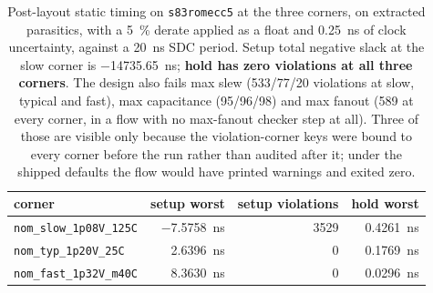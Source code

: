 \documentclass[11pt,a4paper]{article}
\newcommand{\file}[1]{\texttt{\small #1}}
\begin{document}
\begin{table}[t]
\centering
\small
\begin{tabular}{lrrr}
\toprule
corner & setup worst & setup violations & hold worst \\
\midrule
\texttt{nom\_slow\_1p08V\_125C} & \SI{-7.5758}{\nano\second} &
  \num{3529} & \SI{+0.4261}{\nano\second} \\
\texttt{nom\_typ\_1p20V\_25C} & \SI{+2.6396}{\nano\second} &
  \num{0} & \SI{+0.1769}{\nano\second} \\
\texttt{nom\_fast\_1p32V\_m40C} & \SI{+8.3630}{\nano\second} &
  \num{0} & \SI{+0.0296}{\nano\second} \\
\bottomrule
\end{tabular}
\caption{Post-layout static timing on \file{s83romecc5} at the three
corners, on extracted parasitics, with a \SI{5}{\percent} derate
applied as a float and \SI{0.25}{\nano\second} of clock uncertainty,
against a \SI{20}{\nano\second} SDC period. Setup total negative slack
at the slow corner is \SI{-14735.65}{\nano\second}; \textbf{hold has
zero violations at all three corners}. The design also fails max slew
(\num{533}/\num{77}/\num{20} violations at slow, typical and fast), max
capacitance (\num{95}/\num{96}/\num{98}) and max fanout (\num{589} at
every corner, in a flow with no max-fanout checker step at all). Three
of those are visible only because the violation-corner keys were bound
to every corner before the run rather than audited after it; under the
shipped defaults the flow would have printed warnings and exited
zero.}
\label{tab:timing}
\end{table}
\end{document}
